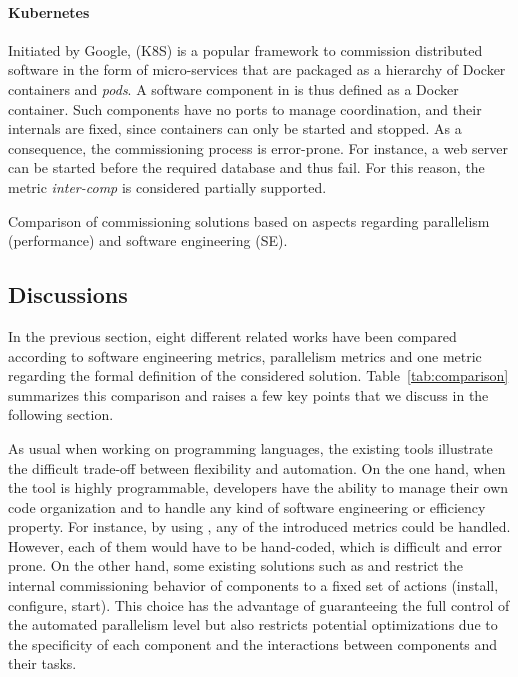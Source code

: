 \paragraph{Kubernetes}
Initiated by Google, \kubernetes (K8S) is a popular framework to
commission distributed software in the form of micro-services that are
packaged as a hierarchy of Docker containers and \emph{pods}. A
software component in \kubernetes is thus defined as a Docker
container. Such components have no ports to manage coordination, and
their internals are fixed, since containers can only be started and
stopped. As a consequence, the commissioning process is
error-prone. For instance, a web server can be started before the
required database and thus fail. For this reason, the metric
\emph{inter-comp} is considered partially supported.

\begin{table*}[tp]
  \centering
  \small
  
  \caption{Comparison of commissioning solutions based on aspects
  regarding parallelism (performance) and software engineering (SE).}
  \label{tab:comparison}
\end{table*}

\subsection{Discussions}

In the previous section, eight different related works have been
compared according to software engineering metrics, parallelism
metrics and one metric regarding the formal definition of the
considered solution. Table~\ref{tab:comparison} summarizes this
comparison and raises a few key points that we discuss in the
following section.

As usual when working on programming languages, the existing
tools illustrate the difficult trade-off between flexibility and
automation. On the one hand, when the tool is highly programmable,
developers have the ability to manage their own code organization and
to handle any kind of software engineering or efficiency property. For
instance, by using \shell, any of the introduced metrics could be
handled. However, each of them would have to be hand-coded, which is
difficult and error prone. On the other hand, some existing solutions
such as \deployware and \juju restrict the internal commissioning
behavior of components to a fixed set of actions (\eg install,
configure, start). This choice has the advantage of guaranteeing the
full control of the automated parallelism level but also restricts
potential optimizations due to the specificity of each component and
the interactions between components and their tasks.

